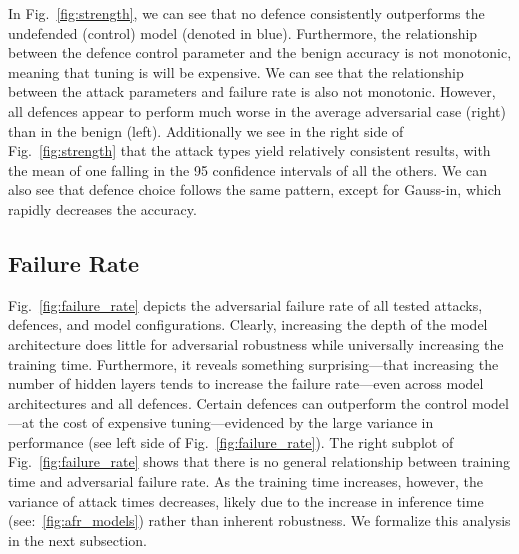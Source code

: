 In Fig.~\ref{fig:strength}, we can see that no defence consistently outperforms the undefended (control) model (denoted in blue). Furthermore, the relationship between the defence control parameter and the benign accuracy is not monotonic, meaning that tuning is will be expensive. We can see that the relationship between the attack parameters and failure rate is also not monotonic. However, all defences appear to perform much worse in the average adversarial case (right) than in the benign (left). Additionally we see in the right side of Fig.~\ref{fig:strength} that the attack types yield relatively consistent results, with the mean of one falling in the 95 confidence intervals of all the others. We can also see that defence choice follows the same pattern, except for Gauss-in, which rapidly decreases the accuracy.


\subsection{Failure Rate}

Fig.~\ref{fig:failure_rate} depicts the adversarial failure rate of all tested attacks, defences, and model configurations. Clearly, increasing the depth of the model architecture does little for adversarial robustness while universally increasing the training time. Furthermore, it reveals something surprising---that increasing the number of hidden layers tends to increase the failure rate---even across model architectures and all defences. Certain defences can outperform the control model---at the cost of expensive tuning---evidenced by the large variance in performance (see left side of Fig.~\ref{fig:failure_rate}). The right subplot of Fig.~\ref{fig:failure_rate} shows that there is no general relationship between training time and adversarial failure rate. 
As the training time increases, however, the variance of attack times decreases, likely due to the increase in inference time (see:~\ref{fig:afr_models}) rather than inherent robustness. We formalize this analysis  in the next subsection.



